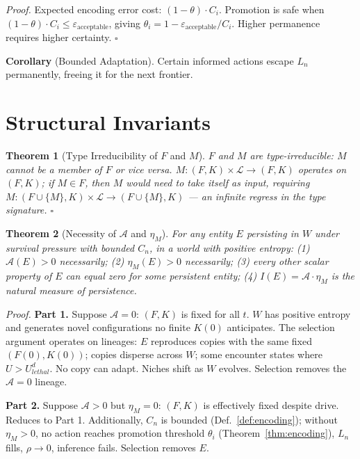 \documentclass[11pt]{article}
\newtheorem{theorem}{Theorem}
\begin{document}
\emph{Proof.} Expected encoding error cost: $(1-\theta) \cdot C_i$. Promotion is safe when $(1-\theta) \cdot C_i \leq \varepsilon_\text{acceptable}$, giving $\theta_i = 1 - \varepsilon_\text{acceptable}/C_i$. Higher permanence requires higher certainty. $\square$

\textbf{Corollary} (Bounded Adaptation). Certain informed actions escape $L_n$ permanently, freeing it for the next frontier.

\section{Structural Invariants}

\begin{theorem}[Type Irreducibility of $F$ and $M$]\label{thm:type}
$F$ and $M$ are type-irreducible: $M$ cannot be a member of $F$ or vice versa. $M : (F,K) \times \mathcal{L} \to (F,K)$ operates \emph{on} $(F,K)$; if $M \in F$, then $M$ would need to take itself as input, requiring $M : (F \cup \{M\}, K) \times \mathcal{L} \to (F \cup \{M\}, K)$ --- an infinite regress in the type signature. $\square$
\end{theorem}

\begin{theorem}[Necessity of $\mathcal{A}$ and $\eta_M$]\label{thm:necessity}
For any entity $E$ persisting in $W$ under survival pressure with bounded $C_n$, in a world with positive entropy: (1) $\mathcal{A}(E) > 0$ necessarily; (2) $\eta_M(E) > 0$ necessarily; (3) every other scalar property of $E$ can equal zero for some persistent entity; (4) $I(E) = \mathcal{A} \cdot \eta_M$ is the natural measure of persistence.
\end{theorem}

\emph{Proof.} \textbf{Part 1.} Suppose $\mathcal{A} = 0$: $(F,K)$ is fixed for all $t$. $W$ has positive entropy and generates novel configurations no finite $K(0)$ anticipates. The selection argument operates on lineages: $E$ reproduces copies with the same fixed $(F(0), K(0))$; copies disperse across $W$; some encounter states where $U > U_{lethal}^d$. No copy can adapt. Niches shift as $W$ evolves. Selection removes the $\mathcal{A} = 0$ lineage.

\textbf{Part 2.} Suppose $\mathcal{A} > 0$ but $\eta_M = 0$: $(F,K)$ is effectively fixed despite drive. Reduces to Part 1. Additionally, $C_n$ is bounded (Def.~\ref{def:encoding}); without $\eta_M > 0$, no action reaches promotion threshold $\theta_i$ (Theorem~\ref{thm:encoding}), $L_n$ fills, $\rho \to 0$, inference fails. Selection removes $E$.
\end{document}
